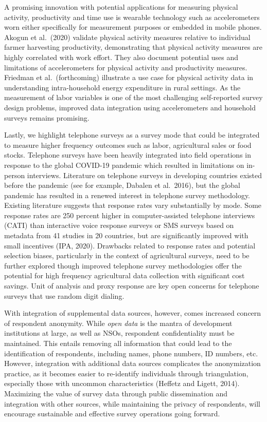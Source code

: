 \documentclass[
]{book}
\begin{document}
A promising innovation with potential applications for measuring physical activity, productivity and time use is wearable technology such as accelerometers worn either specifically for measurement purposes or embedded in mobile phones. Akogun et al.~(2020) validate physical activity measures relative to individual farmer harvesting productivity, demonstrating that physical activity measures are highly correlated with work effort. They also document potential uses and limitations of accelerometers for physical activity and productivity measures. Friedman et al.~(forthcoming) illustrate a use case for physical activity data in understanding intra-household energy expenditure in rural settings. As the measurement of labor variables is one of the most challenging self-reported survey design problems, improved data integration using accelerometers and household surveys remains promising.

Lastly, we highlight telephone surveys as a survey mode that could be integrated to measure higher frequency outcomes such as labor, agricultural sales or food stocks. Telephone surveys have been heavily integrated into field operations in response to the global COVID-19 pandemic which resulted in limitations on in-person interviews. Literature on telephone surveys in developing countries existed before the pandemic (see for example, Dabalen et al.~2016), but the global pandemic has resulted in a renewed interest in telephone survey methodology. Existing literature suggests that response rates vary substantially by mode. Some response rates are 250 percent higher in computer-assisted telephone interviews (CATI) than interactive voice response surveys or SMS surveys based on metadata from 41 studies in 20 countries, but are significantly improved with small incentives (IPA, 2020). Drawbacks related to response rates and potential selection biases, particularly in the context of agricultural surveys, need to be further explored though improved telephone survey methodologies offer the potential for high frequency agricultural data collection with significant cost savings. Unit of analysis and proxy response are key open concerns for telephone surveys that use random digit dialing.

With integration of supplemental data sources, however, comes increased concern of respondent anonymity. While \emph{open data} is the mantra of development institutions at large, as well as NSOs, respondent confidentiality must be maintained. This entails removing all information that could lead to the identification of respondents, including names, phone numbers, ID numbers, etc. However, integration with additional data sources complicates the anonymization practice, as it becomes easier to re-identify individuals through triangulation, especially those with uncommon characteristics (Heffetz and Ligett, 2014). Maximizing the value of survey data through public dissemination and integration with other sources, while maintaining the privacy of respondents, will encourage sustainable and effective survey operations going forward.
\end{document}
